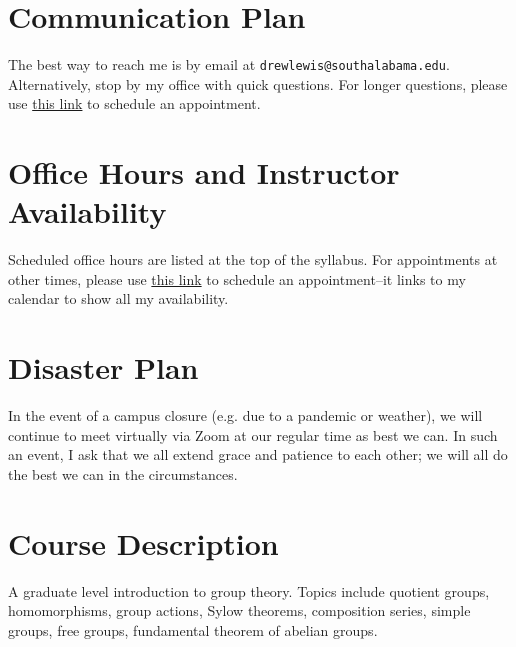 \documentclass{article}
\begin{document}
\section*{\fontsize{12}{15}\selectfont Communication Plan}

The best way to reach me is by email at {\tt drewlewis@southalabama.edu}. Alternatively, stop by my office with quick questions. For longer questions, please use \href{https://calendly.com/dr-lewis}{this link} to schedule an appointment.

\section*{\fontsize{12}{15}\selectfont Office Hours and Instructor Availability}

Scheduled office hours are listed at the top of the syllabus. For appointments at other times, please use \href{https://calendly.com/dr-lewis}{this link} to schedule an appointment--it links to my calendar to show all my availability. 

\section*{\fontsize{12}{15}\selectfont Disaster Plan}
In the event of a campus closure (e.g. due to a pandemic or weather), we will continue to meet virtually via Zoom at our regular time as best we can. In such an event, I ask that we all extend grace and patience to each other; we will all do the best we can in the circumstances.


\section*{\fontsize{12}{15}\selectfont Course Description}
A graduate level introduction to group theory. Topics include quotient groups, homomorphisms, group actions, Sylow theorems, composition series, simple groups, free groups, fundamental theorem of abelian groups.
\end{document}

